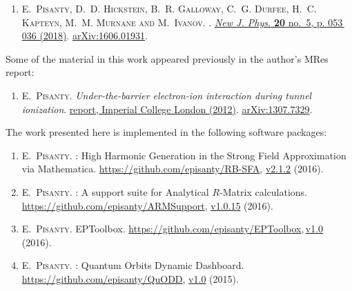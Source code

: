 \begin{enumerate}
\item[{\hypersetup{citecolor=black}\cite{Pisanty_lorentz_2016}}]
\textsc{E.~Pisanty, D.~D. Hickstein, B.~R. Galloway, C.~G. Durfee, H.~C. Kap\-teyn, M.~M. Murnane and M.~Ivanov}.
. \newblock \href{http://dx.doi.org/10.1088/1367-2630/aabb4d}{ \emph{New J. Phys.} \textbf{20} no.~5, p. 053\,036 (2018)}.
\newblock \href{http://arxiv.org/abs/1606.01931}{arXiv:1606.01931}.
\end{enumerate}

\noindent
Some of the material in this work appeared previously in the author's MRes report:
\begin{enumerate}
\item[{\hypersetup{citecolor=black}\cite{MResReport}}]
\textsc{E.~Pisanty}.
\newblock \emph{Under-the-barrier electron-ion interaction during tunnel
  ionization}. 
  \href{http://www3.imperial.ac.uk/controlledquantumdynamics/people/students/cohortthree/emiliopisantyalatorre }{
 report, Imperial College London (2012)}.
\newblock \href{http://arxiv.org/abs/1307.7329}{arXiv:1307.7329}.
\end{enumerate}


\noindent
The work presented here is implemented in the following software packages:

\begin{enumerate}
\item[{\hypersetup{citecolor=black}\cite{RB-SFA}}]
\textsc{E.~Pisanty}.
: {H}igh {H}armonic {G}eneration in the {S}trong {F}ield
  {A}pproximation via {M}athematica.
\newblock \url{https://github.com/episanty/RB-SFA}, \href{http://dx.doi.org/10.5281/zenodo.164626}{v2.1.2} (2016).

\item[{\hypersetup{citecolor=black}\cite{ARMSupport}}]
\textsc{E.~Pisanty}.
: {A} support suite for {A}nalytical {$R$}-{M}atrix
  calculations.
\newblock \url{https://github.com/episanty/ARMSupport}, \href{https://doi.org/10.5281/zenodo.164629}{v1.0.15} (2016).

\item[{\hypersetup{citecolor=black}\cite{EPToolbox}}]
\textsc{E.~Pisanty}. EPToolbox. \url{https://github.com/episanty/EPToolbox},\,\href{https://doi.org/10.5281/zenodo.164630}{v1.0} (2016).

\item[{\hypersetup{citecolor=black}\cite{QuODD}}]
\textsc{E.~Pisanty}.
: Quantum Orbits Dynamic Dashboard.
\newblock \url{https://github.com/episanty/QuODD}, \href{https://doi.org/10.5281/zenodo.164633}{v1.0} (2015).
\end{enumerate}

